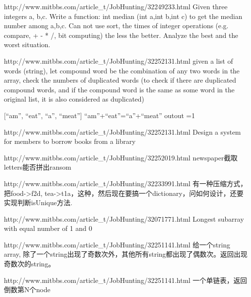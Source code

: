 \documentclass[a4paper]{article}
\begin{document}
\begin{CJK}{UTF8}{gbsn}
\begin{enumerate}
\begin{Q}[Google]{http://www.mitbbs.com/article_t/JobHunting/32249233.html}
Given three integers a, b,c. Write a function: int median (int a,int b,int c) to get the median number among a,b,c. Can not use sort, the times of integer operations (e.g. compare, + - * /, bit computing) the less the better. Analyze the best and the worst situation. 
\end{Q}

\begin{Q}[Amazon]{http://www.mitbbs.com/article_t/JobHunting/32252131.html}
given a list of words (string), let compound word be the combination of any two words in the array, check the numbers of duplicated words (to check if there are duplicated compound words, and if the compound word is the same as some word in the original list, it is also considered as duplicated) 

[``am'', ``eat'', ``a'', ``meat''] ``am''+``eat''=``a''+``meat'' outout =1 
\end{Q}

\begin{Q}[Amazon]{http://www.mitbbs.com/article_t/JobHunting/32252131.html}
Design a system for members to borrow books from a library
\end{Q}

\begin{Q}[Amazon]{http://www.mitbbs.com/article_t/JobHunting/32252019.html}
newspaper截取letters能否拼出ransom
\end{Q}

\begin{Q}[Google]{http://www.mitbbs.com/article_t/JobHunting/32233991.html}
有一种压缩方式，把food->f2d, tea->t1a，这种，然后现在要搞一个dictionary，问如何设计，还要实现判断isUnique方法.
\end{Q}

\begin{Q}{http://www.mitbbs.com/article_t/JobHunting/32071771.html}
Longest subarray with equal number of 1 and 0
\end{Q}

\begin{Q}[Amazon]{http://www.mitbbs.com/article_t/JobHunting/32251141.html}
给一个string array, 除了一个string出现了奇数次外，其他所有string都出现了偶数次。返回出现奇数次的string。
\end{Q}

\begin{Q}[Amazon]{http://www.mitbbs.com/article_t/JobHunting/32251141.html}
一个单链表，返回倒数第N个node
\end{Q}


\end{enumerate}
\end{CJK}
\end{document}
